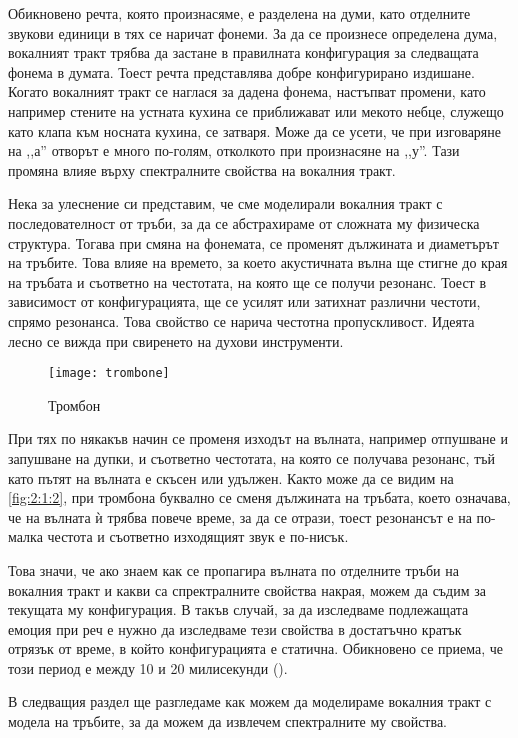 \documentclass[main.tex]{subfiles}
\begin{document}
    Обикновено речта, която произнасяме, е разделена на думи, като отделните звукови единици в тях се наричат фонеми. За да се произнесе определена дума,
    вокалният тракт трябва да застане в правилната конфигурация за следващата фонема в думата. Тоест речта представлява добре конфигурирано издишане. Когато
    вокалният тракт се наглася за дадена фонема, настъпват промени, като например стените на устната кухина се приближават или мекото небце, служещо като клапа към носната
    кухина, се затваря. Може да се усети, че при изговаряне на ,,а'' отворът е много по-голям, отколкото при произнасяне на ,,у''.
    Тази промяна влияе върху спектралните свойства на вокалния тракт.
    
    Нека за улеснение си представим, че сме моделирали вокалния тракт с последователност от тръби, за да се абстрахираме от сложната му физическа структура.
    Тогава при смяна на фонемата, се променят дължината и диаметърът на тръбите. Това влияе на времето, за което акустичната вълна ще стигне до края на тръбата
    и съответно на честотата, на която ще се получи резонанс. Тоест в зависимост от конфигурацията, ще се усилят или затихнат различни честоти, спрямо резонанса.
    Това свойство се нарича честотна пропускливост. Идеята лесно се вижда при свиренето на духови инструменти.

    \begin{figure}[ht]%
    \texttt{[image: trombone]}%
    \caption{Тромбон}%
    \label{fig:2:1:2}
    \end{figure}

    При тях по някакъв начин се променя изходът на вълната, например отпушване и запушване на дупки, и съответно честотата, на която се
    получава резонанс, тъй като пътят на вълната е скъсен или удължен. Както може да се видим на \autoref{fig:2:1:2}, при тромбона буквално се сменя дължината на тръбата,
    което означава, че на вълната ѝ трябва повече време, за да се отрази, тоест резонансът е на по-малка честота и съответно изходящият звук е по-нисък.

    Това значи, че ако знаем как се пропагира вълната по отделните тръби на вокалния тракт и
    какви са спректралните свойства накрая, можем да съдим за текущата му конфигурация.
    В такъв случай, за да изследваме подлежащата емоция при реч е нужно да изследваме тези свойства в достатъчно кратък отрязък от време,
    в който конфигурацията е статична. Обикновено се приема, че този период е между 10 и 20 милисекунди (\cite[стр.~98]{rabiner_schafer}).
    
    В следващия раздел ще разгледаме как можем да моделираме вокалния тракт с модела на тръбите, за да можем да извлечем спектралните му свойства.
\end{document}
